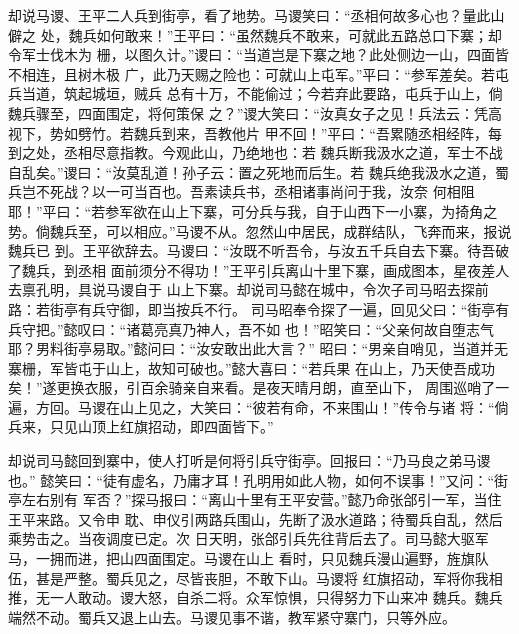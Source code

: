 却说马谡、王平二人兵到街亭，看了地势。马谡笑曰：“丞相何故多心也？量此山僻之
处，魏兵如何敢来！”王平曰：“虽然魏兵不敢来，可就此五路总口下寨；却令军士伐木为
栅，以图久计。”谡曰：“当道岂是下寨之地？此处侧边一山，四面皆不相连，且树木极
广，此乃天赐之险也：可就山上屯军。”平曰：“参军差矣。若屯兵当道，筑起城垣，贼兵
总有十万，不能偷过；今若弃此要路，屯兵于山上，倘魏兵骤至，四面围定，将何策保
之？”谡大笑曰：“汝真女子之见！兵法云：凭高视下，势如劈竹。若魏兵到来，吾教他片
甲不回！”平曰：“吾累随丞相经阵，每到之处，丞相尽意指教。今观此山，乃绝地也：若
魏兵断我汲水之道，军士不战自乱矣。”谡曰：“汝莫乱道！孙子云：置之死地而后生。若
魏兵绝我汲水之道，蜀兵岂不死战？以一可当百也。吾素读兵书，丞相诸事尚问于我，汝奈
何相阻耶！”平曰：“若参军欲在山上下寨，可分兵与我，自于山西下一小寨，为掎角之
势。倘魏兵至，可以相应。”马谡不从。忽然山中居民，成群结队，飞奔而来，报说魏兵已
到。王平欲辞去。马谡曰：“汝既不听吾令，与汝五千兵自去下寨。待吾破了魏兵，到丞相
面前须分不得功！”王平引兵离山十里下寨，画成图本，星夜差人去禀孔明，具说马谡自于
山上下寨。却说司马懿在城中，令次子司马昭去探前路：若街亭有兵守御，即当按兵不行。
司马昭奉令探了一遍，回见父曰：“街亭有兵守把。”懿叹曰：“诸葛亮真乃神人，吾不如
也！”昭笑曰：“父亲何故自堕志气耶？男料街亭易取。”懿问曰：“汝安敢出此大言？”
昭曰：“男亲自哨见，当道并无寨栅，军皆屯于山上，故知可破也。”懿大喜曰：“若兵果
在山上，乃天使吾成功矣！”遂更换衣服，引百余骑亲自来看。是夜天晴月朗，直至山下，
周围巡哨了一遍，方回。马谡在山上见之，大笑曰：“彼若有命，不来围山！”传令与诸
将：“倘兵来，只见山顶上红旗招动，即四面皆下。”

却说司马懿回到寨中，使人打听是何将引兵守街亭。回报曰：“乃马良之弟马谡也。”
懿笑曰：“徒有虚名，乃庸才耳！孔明用如此人物，如何不误事！”又问：“街亭左右别有
军否？”探马报曰：“离山十里有王平安营。”懿乃命张郃引一军，当住王平来路。又令申
耽、申仪引两路兵围山，先断了汲水道路；待蜀兵自乱，然后乘势击之。当夜调度已定。次
日天明，张郃引兵先往背后去了。司马懿大驱军马，一拥而进，把山四面围定。马谡在山上
看时，只见魏兵漫山遍野，旌旗队伍，甚是严整。蜀兵见之，尽皆丧胆，不敢下山。马谡将
红旗招动，军将你我相推，无一人敢动。谡大怒，自杀二将。众军惊惧，只得努力下山来冲
魏兵。魏兵端然不动。蜀兵又退上山去。马谡见事不谐，教军紧守寨门，只等外应。

